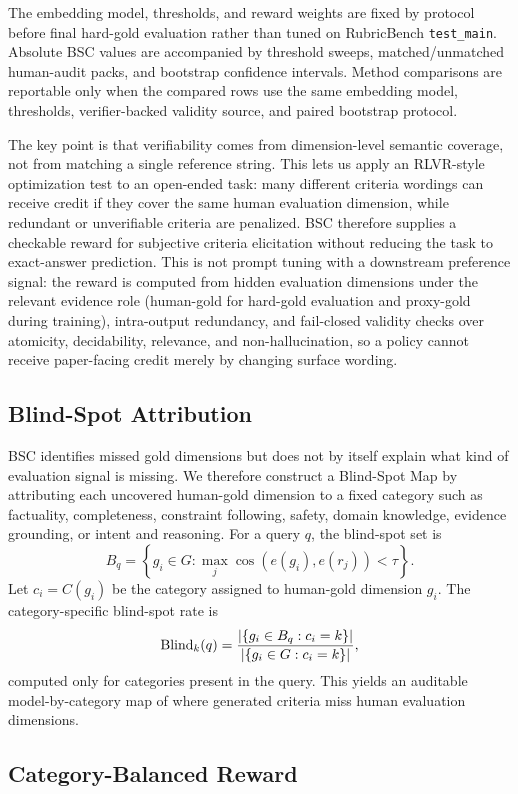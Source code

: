 The embedding model, thresholds, and reward weights are fixed by protocol
before final hard-gold evaluation rather than tuned on
RubricBench \texttt{test\_main}. Absolute BSC values are accompanied by
threshold sweeps, matched/unmatched human-audit packs, and bootstrap confidence
intervals. Method comparisons are reportable only when the compared rows use
the same embedding model, thresholds, verifier-backed validity source, and
paired bootstrap protocol.

The key point is that verifiability comes from dimension-level semantic
coverage, not from matching a single reference string. This lets us apply
an RLVR-style optimization test to an open-ended task: many different criteria
wordings can receive credit if they cover the same human evaluation dimension,
while redundant or unverifiable criteria are penalized. BSC therefore supplies a
checkable reward for subjective criteria elicitation without reducing the task
to exact-answer prediction.
This is not prompt tuning with a downstream preference signal: the reward is
computed from hidden evaluation dimensions under the relevant evidence role
(human-gold for hard-gold evaluation and proxy-gold during training),
intra-output redundancy, and fail-closed validity checks over atomicity,
decidability, relevance, and non-hallucination, so a policy cannot receive
paper-facing credit merely by changing surface wording.

\subsection{Blind-Spot Attribution}

BSC identifies missed gold dimensions but does not by itself explain what kind
of evaluation signal is missing. We therefore construct a Blind-Spot Map by
attributing each uncovered human-gold dimension to a fixed category such as
factuality, completeness, constraint following, safety, domain knowledge,
evidence grounding, or intent and reasoning. For a query $q$, the blind-spot set is
\[
B_q=\left\{g_i \in G: \max_j \cos(e(g_i), e(r_j)) < \tau\right\}.
\]
Let $c_i = C(g_i)$ be the category assigned to human-gold dimension $g_i$. The
category-specific blind-spot rate is
\[
\mathrm{Blind}_k(q) =
\frac{|\{g_i \in B_q: c_i=k\}|}{|\{g_i \in G: c_i=k\}|},
\]
computed only for categories present in the query. This yields an auditable
model-by-category map of where generated criteria miss human evaluation
dimensions.

\subsection{Category-Balanced Reward}

